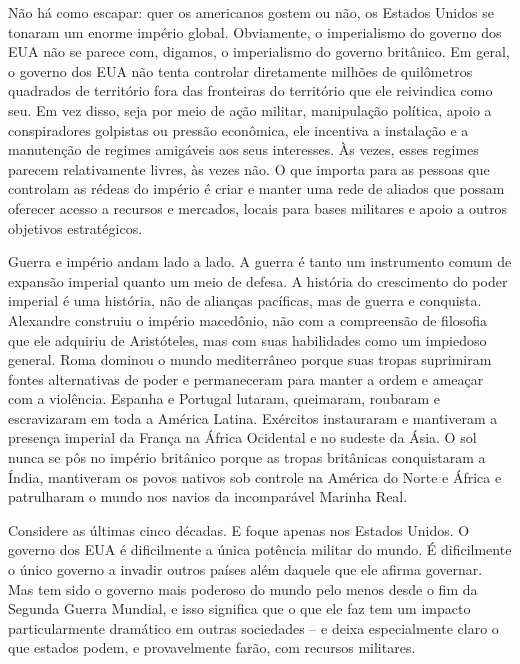Não há como escapar: quer os americanos gostem ou não, os Estados Unidos se tonaram um enorme império global. Obviamente, o imperialismo do governo dos EUA não se parece com, digamos, o imperialismo do governo britânico. Em geral, o governo dos EUA não tenta controlar diretamente milhões de quilômetros quadrados de território fora das fronteiras do território que ele reivindica como seu. Em vez disso, seja por meio de ação militar, manipulação política, apoio a conspiradores golpistas ou pressão econômica, ele incentiva a instalação e a manutenção de regimes amigáveis aos seus interesses. Às vezes, esses regimes parecem relativamente livres, às vezes não. O que importa para as pessoas que controlam as rédeas do império é criar e manter uma rede de aliados que possam oferecer acesso a recursos e mercados, locais para bases militares e apoio a outros objetivos estratégicos.

Guerra e império andam lado a lado. A guerra é tanto um instrumento comum de expansão imperial quanto um meio de defesa. A história do crescimento do poder imperial é uma história, não de alianças pacíficas, mas de guerra e conquista. Alexandre construiu o império macedônio, não com a compreensão de filosofia que ele adquiriu de Aristóteles, mas com suas habilidades como um impiedoso general. Roma dominou o mundo mediterrâneo porque suas tropas suprimiram fontes alternativas de poder e permaneceram para manter a ordem e ameaçar com a violência. Espanha e Portugal lutaram, queimaram, roubaram e escravizaram em toda a América Latina. Exércitos instauraram e mantiveram a presença imperial da França na África Ocidental e no sudeste da Ásia. O sol nunca se pôs no império britânico porque as tropas britânicas conquistaram a Índia, mantiveram os povos nativos sob controle na América do Norte e África e patrulharam o mundo nos navios da incomparável Marinha Real.

Considere as últimas cinco décadas. E foque apenas nos Estados Unidos. O governo dos EUA é dificilmente a única potência militar do mundo. É dificilmente o único governo a invadir outros países além daquele que ele afirma governar. Mas tem sido o governo mais poderoso do mundo pelo menos desde o fim da Segunda Guerra Mundial, e isso significa que o que ele faz tem um impacto particularmente dramático em outras sociedades -- e deixa especialmente claro o que estados podem, e provavelmente farão, com recursos militares.

